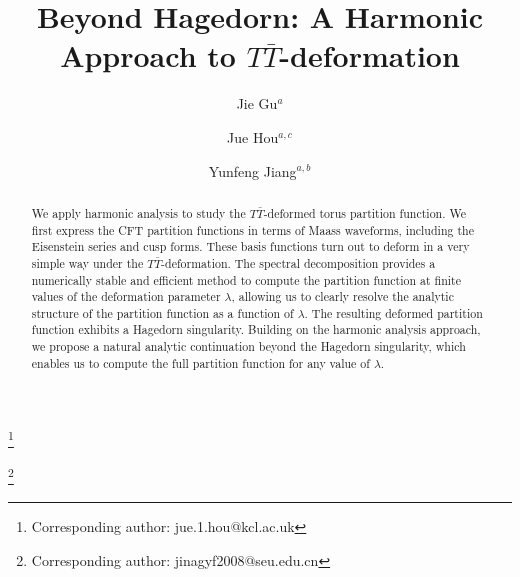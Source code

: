 \documentclass[aps,twocolumn,prl,showpacs,amsmath,amssymb,10pt]{revtex4-2}
\begin{document}
\title{Beyond Hagedorn: A Harmonic Approach to $T\bar{T}$-deformation}


\author{Jie Gu$^{a}$}

\author{Jue Hou$^{a,c}$}
\thanks{Corresponding author: jue.1.hou@kcl.ac.uk}

\author{Yunfeng Jiang$^{a,b}$}
\thanks{Corresponding author: jinagyf2008@seu.edu.cn}






\begin{abstract}
We apply harmonic analysis to study the $T\bar{T}$-deformed torus partition function. We first express the CFT partition functions in terms of Maass waveforms, including the Eisenstein series and cusp forms. These basis functions turn out to deform in a very simple way under the $T\bar{T}$-deformation. The spectral decomposition provides a numerically stable and efficient method to compute the partition function at finite values of the deformation parameter $\lambda$, allowing us to clearly resolve the analytic structure of the partition function as a function of $\lambda$. The resulting deformed partition function exhibits a Hagedorn singularity. Building on the harmonic analysis approach, we propose a natural analytic continuation beyond the Hagedorn singularity, which enables us to compute the full partition function for any value of $\lambda$.

\end{abstract}

\maketitle
\end{document}
